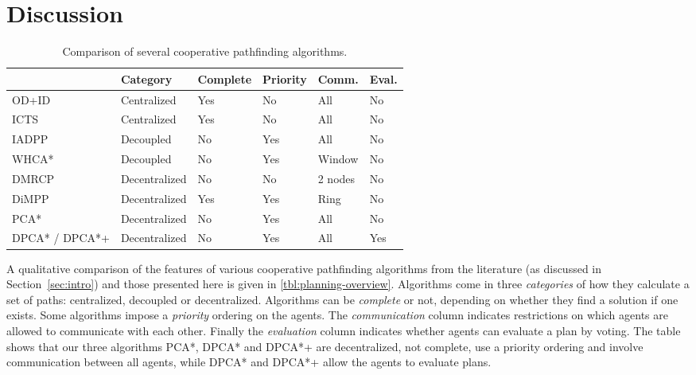 \section{Discussion}\label{sec:discussion}
\begin{table*}[h]
    \centering
    \caption{Comparison of several cooperative pathfinding algorithms.}
    \label{tbl:planning-overview}
    \begin{tabular}{ll|l|l|l|l|l}
        & & Category & Complete & Priority & Comm. & Eval. \\
        \hline
        OD+ID & \cite{standley2010,standley2011} & Centralized & Yes & No &
        All & No \\
        ICTS & \cite{sharon2013} & Centralized & Yes & No & All & No\\
        IADPP & \cite{cap2012} & Decoupled & No & Yes & All & No \\
        WHCA* & \cite{silver2005} & Decoupled & No & Yes & Window & No \\
        DMRCP & \cite{wei2016} & Decentralized & No & No & 2 nodes & No
        \\
        DiMPP & \cite{chouhan2017} & Decentralized & Yes & Yes & Ring & No
        \\ \hline
        PCA* & & Decentralized & No & Yes & All & No \\
        \multicolumn{2}{l|}{DPCA* / DPCA*+} & Decentralized & No & Yes & All & 
        Yes \\
    \end{tabular}
\end{table*}

A qualitative comparison of the features of various cooperative pathfinding algorithms from 
the literature (as discussed in Section~\ref{sec:intro}) and those presented here is given in 
\autoref{tbl:planning-overview}. Algorithms come in three \emph{categories} of how  they 
calculate a set of paths: centralized, decoupled or decentralized. 
Algorithms can be \emph{complete} or not, depending on whether they find a solution if one exists. Some algorithms impose a \emph{priority} ordering on 
the agents. The 
\emph{communication} column indicates restrictions on which agents are allowed 
to communicate with each other. Finally the \emph{evaluation} column indicates whether 
agents can evaluate a plan by voting. The table shows that our three algorithms PCA*, DPCA* and DPCA*+ are decentralized, not complete, use a priority ordering and involve communication between all agents, while DPCA* and DPCA*+ allow the agents to evaluate plans.


